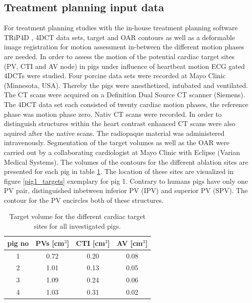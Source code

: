 \documentclass[type=dr, dr=rernat, accentcolor=tud7b,colorbacktitle, bigchapter, openright, twoside, 12pt ]{tudthesis}
\begin{document}
\subsection{Treatment planning input data}
For treatment planning studies with the in-house treatment planning software TRiP4D \cite{Ric13}, 4DCT data sets, target and OAR contours as 
well as a deformable image registration for motion assessment in-between the different motion phases are needed.\newline
\newline
In order to assess the motion of the potential cardiac target sites (PV, CTI and AV node) in pigs under influence of heartbeat motion 
ECG gated 4DCTs were studied. Four porcine data sets were recorded at Mayo Clinic (Minnesota, USA). Thereby the pigs were anesthetized, 
intubated and ventilated. The CT scans were acquired on a Definition Dual Source CT scanner (Siemens). The 4DCT data set each consisted of 
twenty cardiac motion phases, the reference phase was motion phase zero. Nativ CT scans were recorded. In order to distinguish structures 
within the heart contrast enhanced CT scans were also aquired after the native scans. The radiopaque material was administered intravenously.\newline
\newline
Segmentation of the target volumes as well as the OAR were carried out by a collaborating cardiologist at Mayo Clinic with Eclipse\texttrademark 
(Varian Medical Systems). The volumes of the contours for the different ablation sites are presented for each pig in table 
\ref{tab:volume:mayo:porcine}. The location of these sites are visualized in figure \ref{pig1_targets} exemplary for pig 1. 
Contrary to humans pigs have only one PV pair, distinguished inbetween inferior PV (IPV) and superior PV (SPV). The contour for the 
PV encircles both of these structures. 

\vspace*{-0.4cm}

\begin{table}[htbp]
  \centering
  \caption{Target volume for the different cardiac target sites for all investigated pigs.}
  \begin{tabular}{|c|c|c|c|}
    \hline\hline
    pig no\rule{0pt}{2.6ex}\rule[-1.2ex]{0pt}{0pt} & PVs [cm$^{3}$] & CTI [cm$^{3}$] & AV [cm$^{3}$]\\
    \hline
    1 & 0.72 & 0.20 & 0.08 \\
    2 & 1.01 & 0.13 & 0.05 \\
    3 & 1.09 & 0.24 & 0.06 \\
    4 & 1.03 & 0.31 & 0.02 \\
    \hline\hline
  \end{tabular}
  \label{tab:volume:mayo:porcine}
\end{table}
\end{document}
